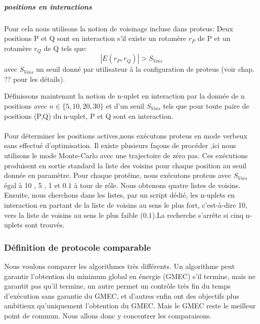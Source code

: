 \subparagraph{positions en interactions}
Pour cela nous utilisons la notion de voisinage incluse dans proteus: 
Deux positions P et Q sont en interaction s'il existe un rotamère $r_P$ de P et un rotamère $r_Q$ de Q tels que:
\begin{displaymath}
 | E(r_P,r_Q) | > S_{Vois}
\end{displaymath} 
avec $S_{Vois}$ un seuil donné par utilisateur à la configuration de proteus (voir chap. ?? pour les détails).

Définissons maintenant la notion de n-uplet en interaction par la donnée de n positions avec $n \in \{5,10,20,30\}$ et d'un seuil  $S_{Vois}$  tels que pour toute paire de positions (P,Q) du n-uplet, P et Q sont en interaction.
\paragraph{}
Pour déterminer les positions actives,nous exécutons proteus en mode verbeux sans effectué d'optimisation.
Il existe plusieurs façons de procéder ,ici nous utilisons le mode Monte-Carlo avec une trajectoire de zéro pas. Ces exécutions produisent en sortie standard la liste des voisins pour chaque position au seuil donnée en paramètre.
Pour chaque protéine, nous exécutons proteus avec  $S_{Vois}$ égal à 10 , 5 , 1 et $0.1$ à tour de rôle. Nous obtenons quatre listes de voisins. 
Ensuite, nous cherchons dans les listes, par un script dédié, les n-uplets en interaction en partant de la liste de voisins au sens le plus fort, c'est-à-dire 10, vers la liste de voisins au sens le plus faible ($0.1$).La recherche s'arrête si cinq n-uplets sont trouvés.

\subsubsection{Définition de protocole comparable}

Nous voulons comparer les algorithmes très différents. Un algorithme peut garantir l'obtention du minimum global en énergie (GMEC) s'il termine, mais ne garantit pas qu'il termine, un autre permet un contrôle très fin du temps d'exécution sans garantie du GMEC, et d'autres enfin ont des objectifs plus ambitieux  qu'uniquement l'obtention du GMEC.
Mais le GMEC reste le meilleur point de commun. Nous allons donc y concentrer les comparaisons.


